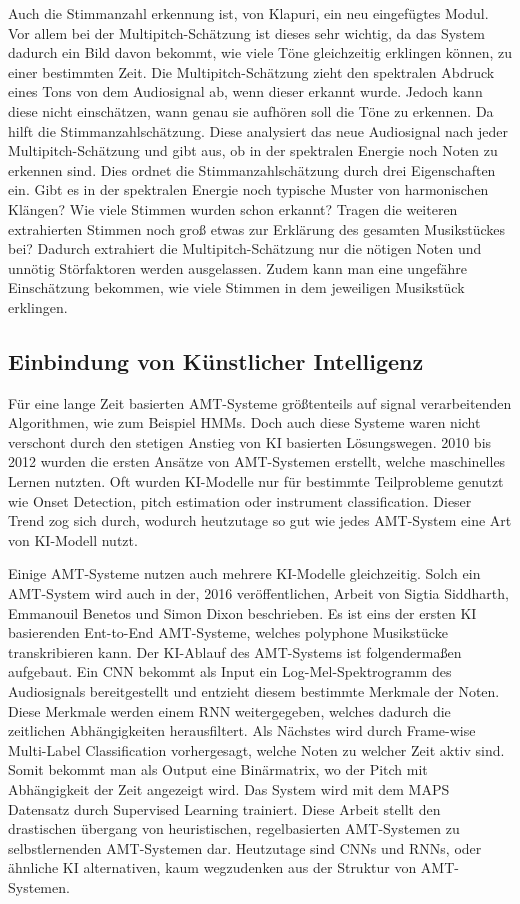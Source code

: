 Auch die Stimmanzahl erkennung ist, von Klapuri, ein neu eingefügtes Modul.
Vor allem bei der Multipitch-Schätzung ist dieses sehr wichtig, da das System dadurch ein Bild davon bekommt,
wie viele Töne gleichzeitig erklingen können, zu einer bestimmten Zeit.
Die Multipitch-Schätzung zieht den spektralen Abdruck eines Tons von dem Audiosignal ab, wenn dieser erkannt wurde.
Jedoch kann diese nicht einschätzen, wann genau sie aufhören soll die Töne zu erkennen.
Da hilft die Stimmanzahlschätzung.
Diese analysiert das neue Audiosignal nach jeder Multipitch-Schätzung und gibt aus,
ob in der spektralen Energie noch Noten zu erkennen sind.
Dies ordnet die Stimmanzahlschätzung durch drei Eigenschaften ein.
Gibt es in der spektralen Energie noch typische Muster von harmonischen Klängen?
Wie viele Stimmen wurden schon erkannt?
Tragen die weiteren extrahierten Stimmen noch groß etwas zur Erklärung des gesamten Musikstückes bei?
Dadurch extrahiert die Multipitch-Schätzung nur die nötigen Noten und unnötig Störfaktoren werden ausgelassen.
Zudem kann man eine ungefähre Einschätzung bekommen, wie viele Stimmen in dem jeweiligen Musikstück erklingen.

\subsection{Einbindung von Künstlicher Intelligenz}
Für eine lange Zeit basierten AMT-Systeme größtenteils auf signal verarbeitenden Algorithmen, wie zum Beispiel HMMs.
Doch auch diese Systeme waren nicht verschont durch den stetigen Anstieg von KI basierten Lösungswegen.
2010 bis 2012 wurden die ersten Ansätze von AMT-Systemen erstellt, welche maschinelles Lernen nutzten.
\cite{eyben2010universal}
Oft wurden KI-Modelle nur für bestimmte Teilprobleme genutzt
wie Onset Detection, pitch estimation oder instrument classification.
Dieser Trend zog sich durch, wodurch heutzutage so gut wie jedes AMT-System eine Art von KI-Modell nutzt.

Einige AMT-Systeme nutzen auch mehrere KI-Modelle gleichzeitig.
Solch ein AMT-System wird auch in der, 2016 veröffentlichen, Arbeit
von Sigtia Siddharth, Emmanouil Benetos und Simon Dixon beschrieben.
\cite{sigtia2016end}
Es ist eins der ersten KI basierenden Ent-to-End AMT-Systeme, welches polyphone Musikstücke transkribieren kann.
Der KI-Ablauf des AMT-Systems ist folgendermaßen aufgebaut.
Ein CNN bekommt als Input ein Log-Mel-Spektrogramm des Audiosignals bereitgestellt
und entzieht diesem bestimmte Merkmale der Noten.
Diese Merkmale werden einem RNN weitergegeben, welches dadurch die zeitlichen Abhängigkeiten herausfiltert.
Als Nächstes wird durch Frame-wise Multi-Label Classification vorhergesagt, welche Noten zu welcher Zeit aktiv sind.
Somit bekommt man als Output eine Binärmatrix, wo der Pitch mit Abhängigkeit der Zeit angezeigt wird.
Das System wird mit dem MAPS Datensatz durch Supervised Learning trainiert.
Diese Arbeit stellt den drastischen übergang von heuristischen, regelbasierten AMT-Systemen
zu selbstlernenden AMT-Systemen dar.
Heutzutage sind CNNs und RNNs, oder ähnliche KI alternativen, kaum wegzudenken aus der Struktur von AMT-Systemen.

